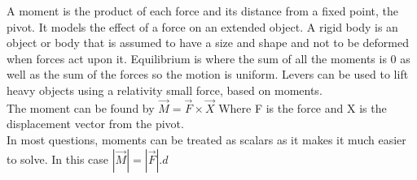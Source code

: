 \documentclass[class=article, crop=false]{standalone}
\begin{document}
A moment is the product of each force and its distance from a fixed point, the pivot. It models the effect of a force on an extended object. A rigid body is an object or body that is assumed to have a size and shape and not to be deformed when forces act upon it. Equilibrium is where the sum of all the moments is 0 as well as the sum of the forces so the motion is uniform. Levers can be used to lift heavy objects using a relativity small force, based on moments. \\

The moment can be found by $\vec{M} = \vec{F} \times \vec{X}$ Where F is the force and X is the displacement vector from the pivot. \\

In most questions, moments can be treated as scalars as it makes it much easier to solve. In this case $|\vec{M}| = |\vec{F}|.d$
\end{document}
